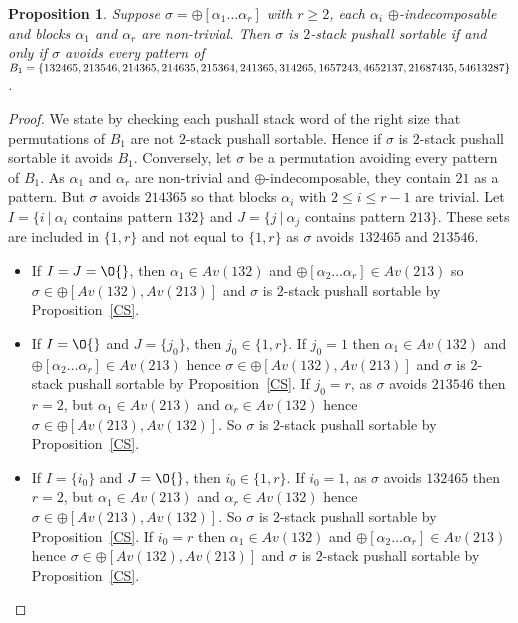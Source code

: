 \documentclass[11pt]{article}
\newtheorem{prop}[thm]{Proposition}
\newcommand{\pushall}{$2$-stack pushall sortable\xspace}
\begin{document}
\begin{prop}
\label{prop:B1}
Suppose $\sigma = \oplus[\alpha_1 \dots \alpha_r]$ with $r\geq 2$, each $\alpha_i$ $\oplus$-indecomposable and blocks $\alpha_1$ and $\alpha_r$ are non-trivial. 
Then $\sigma$ is \pushall if and only if $\sigma$ avoids every pattern of $B_1 = \{ 132465, 213546, 214365, 214635, 215364, \linebreak[1] 241365, 314265, 1657243, 4652137, \linebreak 21687435, 54613287 \}$.
\end{prop}
\begin{proof}



We state by checking each pushall stack word of the right size that permutations of $B_1$ are not \pushall. 
Hence if $\sigma$ is \pushall it avoids $B_1$. 
Conversely, let $\sigma$ be a permutation avoiding every pattern of $B_1$. 
As $\alpha_1$ and $\alpha_r$ are non-trivial and $\oplus$-indecomposable, they contain $21$ as a pattern. 
But $\sigma$ avoids $214365$ so that blocks $\alpha_i$ with $2 \leq i \leq r-1$ are trivial. 
Let $I = \{i\ |\ \alpha_i$ contains pattern $132 \}$ and $J = \{j\ |\ \alpha_j$ contains pattern $213 \}$. 
These sets are included in $\{1, r\}$ and not equal to $\{1, r\}$ as $\sigma$ avoids $132465$ and $213546$.
\begin{itemize}
\item If $I = J = \O{}$, then $\alpha_1 \in Av(132)$ and $\oplus[\alpha_2 \dots \alpha_r] \in Av(213)$ so $\sigma \in \oplus[Av(132), Av(213)]$ and $\sigma$ is \pushall by Proposition~\ref{CS}.
\item If $I = \O{}$ and $J = \{ j_0\}$, then $j_0 \in \{1, r\}$.
If $j_0 = 1$ then $\alpha_1 \in Av(132)$ and $\oplus[\alpha_2 \dots \alpha_r] \in Av(213)$ hence $\sigma \in \oplus[Av(132), Av(213)]$ and $\sigma$ is \pushall by Proposition~\ref{CS}.
If $j_0 = r$, as $\sigma$ avoids $213546$ then $r = 2$, but $\alpha_1 \in Av(213)$ and $\alpha_r \in Av(132)$ hence $\sigma \in \oplus[Av(213), Av(132)]$. 
So $\sigma$ is \pushall by Proposition~\ref{CS}.

\item If $I = \{ i_0\}$ and $J = \O{}$, then $i_0 \in \{1, r\}$.
If $i_0 = 1$, as $\sigma$ avoids $132465$ then $r = 2$, but $\alpha_1 \in Av(213)$ and $\alpha_r \in Av(132)$ hence $\sigma \in \oplus[Av(213), Av(132)]$. 
So $\sigma$ is \pushall by Proposition~\ref{CS}.
If $i_0 = r$ then $\alpha_1 \in Av(132)$ and $\oplus[\alpha_2 \dots \alpha_r] \in Av(213)$ hence $\sigma \in \oplus[Av(132), Av(213)]$ and $\sigma$ is \pushall by Proposition~\ref{CS}.


\end{itemize}
\end{proof}
\end{document}
